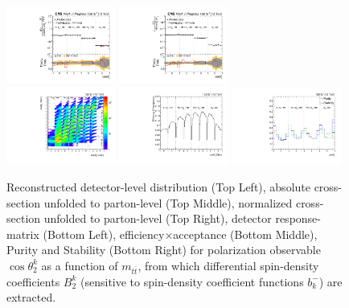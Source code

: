 \begin{refsection}
\begin{figure}[htb]
\begin{center}
 \includegraphics[width=0.32\textwidth]{fig_fullRun2UL/unfolding/combined/UnfoldedResults_b2k_mttbar.pdf}
 \includegraphics[width=0.32\textwidth]{fig_fullRun2UL/unfolding/combined/UnfoldedResultsNorm_b2k_mttbar.pdf} \\
 \includegraphics[width=0.32\textwidth]{fig_fullRun2UL/unfolding/combined/ResponseMatrix_b2k_mttbar.pdf}
 \includegraphics[width=0.32\textwidth]{fig_fullRun2UL/unfolding/combined/TotEff_b2k_mttbar.pdf}
 \includegraphics[width=0.32\textwidth]{fig_fullRun2UL/unfolding/combined/PurStab_b2k_mttbar.pdf} \\
\caption{Reconstructed detector-level distribution (Top Left), absolute cross-section unfolded to parton-level (Top Middle), normalized cross-section unfolded to parton-level (Top Right), detector response-matrix (Bottom Left), efficiency$\times$acceptance (Bottom Middle), Purity and Stability (Bottom Right) for polarization observable $\cos\theta_{2}^{k}$ as a function of $m_{t\bar{t}}$, from which differential spin-density coefficients $B_{2}^{k}$ (sensitive to spin-density coefficient functions $b_k^{-}$) are extracted.}

\end{center}
\end{figure}
\end{refsection}

